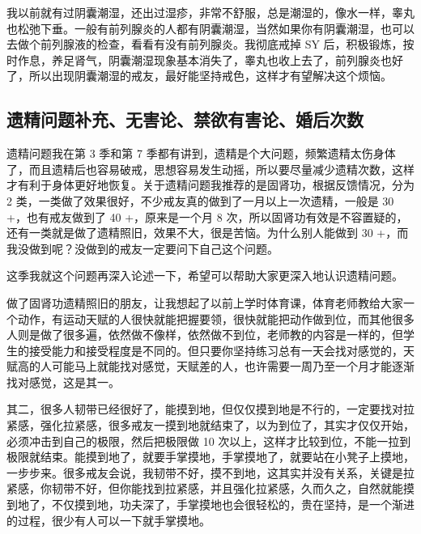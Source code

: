 \documentclass{ctexart}
\begin{document}
我以前就有过阴囊潮湿，还出过湿疹，非常不舒服，总是潮湿的，像水一样，睾丸也松弛下垂。一般有前列腺炎的人都有阴囊潮湿，当然如果你有阴囊潮湿，也可以去做个前列腺液的检查，看看有没有前列腺炎。我彻底戒掉 SY 后，积极锻炼，按时作息，养足肾气，阴囊潮湿现象基本消失了，睾丸也收上去了，前列腺炎也好了，所以出现阴囊潮湿的戒友，最好能坚持戒色，这样才有望解决这个烦恼。

\subsection{遗精问题补充、无害论、禁欲有害论、婚后次数}

遗精问题我在第 3 季和第 7 季都有讲到，遗精是个大问题，频繁遗精太伤身体了，而且遗精后也容易破戒，思想容易发生动摇，所以要尽量减少遗精次数，这样才有利于身体更好地恢复。关于遗精问题我推荐的是固肾功，根据反馈情况，分为 2 类，一类做了效果很好，不少戒友真的做到了一月以上一次遗精，一般是 30 +，也有戒友做到了 40 +，原来是一个月 8 次，所以固肾功有效是不容置疑的，还有一类就是做了遗精照旧，效果不大，很是苦恼。为什么别人能做到 30 +，而我没做到呢？没做到的戒友一定要问下自己这个问题。

这季我就这个问题再深入论述一下，希望可以帮助大家更深入地认识遗精问题。

做了固肾功遗精照旧的朋友，让我想起了以前上学时体育课，体育老师教给大家一个动作，有运动天赋的人很快就能把握要领，很快就能把动作做到位，而其他很多人则是做了很多遍，依然做不像样，依然做不到位，老师教的内容是一样的，但学生的接受能力和接受程度是不同的。但只要你坚持练习总有一天会找对感觉的，天赋高的人可能马上就能找对感觉，天赋差的人，也许需要一周乃至一个月才能逐渐找对感觉，这是其一。

其二，很多人韧带已经很好了，能摸到地，但仅仅摸到地是不行的，一定要找对拉紧感，强化拉紧感，很多戒友一摸到地就结束了，以为到位了，其实才仅仅开始，必须冲击到自己的极限，然后把极限做 10 次以上，这样才比较到位，不能一拉到极限就结束。能摸到地了，就要手掌摸地，手掌摸地了，就要站在小凳子上摸地，一步步来。很多戒友会说，我韧带不好，摸不到地，这其实并没有关系，关键是拉紧感，你韧带不好，但你能找到拉紧感，并且强化拉紧感，久而久之，自然就能摸到地了，不仅摸到地，功夫深了，手掌摸地也会很轻松的，贵在坚持，是一个渐进的过程，很少有人可以一下就手掌摸地。
\end{document}

